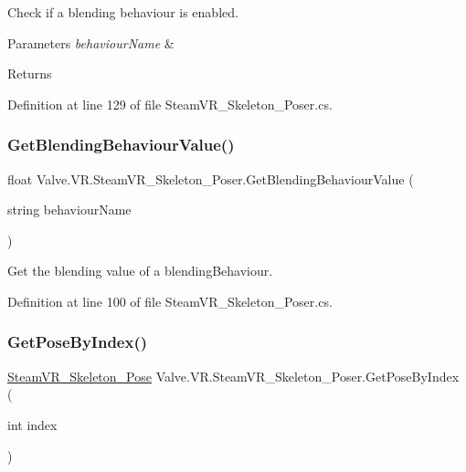 Check if a blending behaviour is enabled. 


\begin{DoxyParams}{Parameters}
{\em behaviour\+Name} & \\
\hline
\end{DoxyParams}
\begin{DoxyReturn}{Returns}

\end{DoxyReturn}


Definition at line 129 of file Steam\+V\+R\+\_\+\+Skeleton\+\_\+\+Poser.\+cs.

\mbox{\label{class_valve_1_1_v_r_1_1_steam_v_r___skeleton___poser_a7e788c608463b075fb08a1ac5971f14d}} 
\subsubsection{\texorpdfstring{GetBlendingBehaviourValue()}{GetBlendingBehaviourValue()}}
{\footnotesize\ttfamily float Valve.\+V\+R.\+Steam\+V\+R\+\_\+\+Skeleton\+\_\+\+Poser.\+Get\+Blending\+Behaviour\+Value (\begin{DoxyParamCaption}\item[{string}]{behaviour\+Name }\end{DoxyParamCaption})}



Get the blending value of a blending\+Behaviour. 



Definition at line 100 of file Steam\+V\+R\+\_\+\+Skeleton\+\_\+\+Poser.\+cs.

\mbox{\label{class_valve_1_1_v_r_1_1_steam_v_r___skeleton___poser_a403f95ce0a6e6c69c48a27b40a719623}} 
\subsubsection{\texorpdfstring{GetPoseByIndex()}{GetPoseByIndex()}}
{\footnotesize\ttfamily \mbox{\hyperlink{class_valve_1_1_v_r_1_1_steam_v_r___skeleton___pose}{Steam\+V\+R\+\_\+\+Skeleton\+\_\+\+Pose}} Valve.\+V\+R.\+Steam\+V\+R\+\_\+\+Skeleton\+\_\+\+Poser.\+Get\+Pose\+By\+Index (\begin{DoxyParamCaption}\item[{int}]{index }\end{DoxyParamCaption})}



